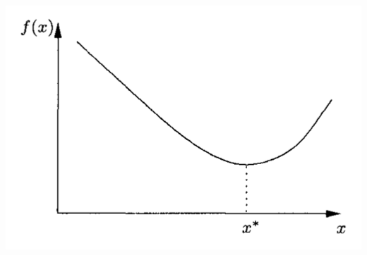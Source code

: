 \documentclass[11pt,a4paper,oneside]{article}
\newenvironment{Figure}		%
	{\par\medskip\noindent\minipage{\linewidth}}
	{\endminipage\par\medskip}
\begin{document}
\begin{Figure}
	\centering
	\includegraphics[width=0.6\linewidth]{./Images/4-LocalOptimum}
	\label{fig:LocalOptimum}
\end{Figure}
\end{document}
